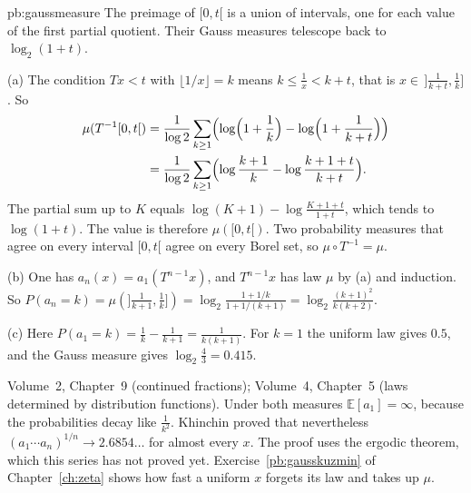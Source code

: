 \begin{solution}{pb:gaussmeasure}
\idea The preimage of $[0,t[$ is a union of intervals, one for each value of the first partial quotient. Their Gauss measures
telescope back to $\log_2(1+t)$.

\writeup (a) The condition $Tx<t$ with $\lfloor1/x\rfloor=k$ means $k\le\frac1x<k+t$, that is $x\in\,]\frac1{k+t},\frac1k]$. So
\[
\begin{aligned}
\mu(T^{-1}[0,t[)&=\frac1{\log2}\sum_{k\ge1}\Bigl(\log\Bigl(1+\frac1k\Bigr)-\log\Bigl(1+\frac1{k+t}\Bigr)\Bigr)\\
&=\frac1{\log2}\sum_{k\ge1}\Bigl(\log\frac{k+1}k-\log\frac{k+1+t}{k+t}\Bigr).
\end{aligned}
\]
The partial sum up to $K$ equals $\log(K+1)-\log\frac{K+1+t}{1+t}$, which tends to $\log(1+t)$. The value is therefore $\mu([0,t[)$. Two probability measures that
agree on every interval $[0,t[$ agree on every Borel set, so $\mu\circ T^{-1}=\mu$.

(b) One has $a_n(x)=a_1(T^{n-1}x)$, and $T^{n-1}x$ has law $\mu$ by (a) and induction. So
$P(a_n=k)=\mu(]\frac1{k+1},\frac1k])=\log_2\frac{1+1/k}{1+1/(k+1)}=\log_2\frac{(k+1)^2}{k(k+2)}$.

(c) Here $P(a_1=k)=\frac1k-\frac1{k+1}=\frac1{k(k+1)}$. For $k=1$ the uniform law gives $0.5$, and the Gauss measure gives $\log_2\frac43=0.415$.

\tools Volume~2, Chapter~9 (continued fractions); Volume~4, Chapter~5 (laws determined by distribution functions).
\leads Under both measures $\mathbb E[a_1]=\infty$, because the probabilities decay like $\frac1{k^2}$. Khinchin proved that nevertheless
$(a_1\cdots a_n)^{1/n}\to2.6854\ldots$ for almost every $x$. The proof uses the ergodic theorem, which this series has not proved yet. Exercise~\ref{pb:gausskuzmin} of Chapter~\ref{ch:zeta} shows how fast a uniform $x$ forgets its law and takes up $\mu$.
\end{solution}

